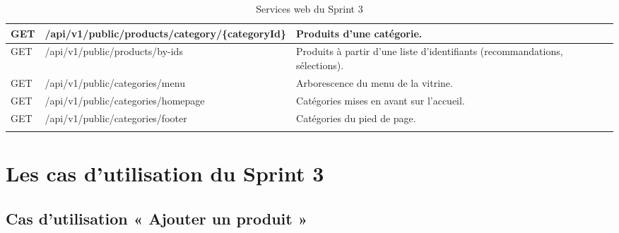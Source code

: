 \begin{longtable}{|p{1.5cm}|p{6.8cm}|p{6.2cm}|}
\hline
GET & /api/v1/public/products/category/\{categoryId\} & Produits d'une catégorie. \\
\hline
GET & /api/v1/public/products/by-ids & Produits à partir d'une liste d'identifiants (recommandations, sélections). \\
\hline
GET & /api/v1/public/categories/menu & Arborescence du menu de la vitrine. \\
\hline
GET & /api/v1/public/categories/homepage & Catégories mises en avant sur l'accueil. \\
\hline
GET & /api/v1/public/categories/footer & Catégories du pied de page. \\
\hline
\caption{Services web du Sprint 3}
\label{tab:ws-sprint3}
\end{longtable}

\section{Les cas d'utilisation du Sprint 3}
\subsection{Cas d'utilisation « Ajouter un produit »}
